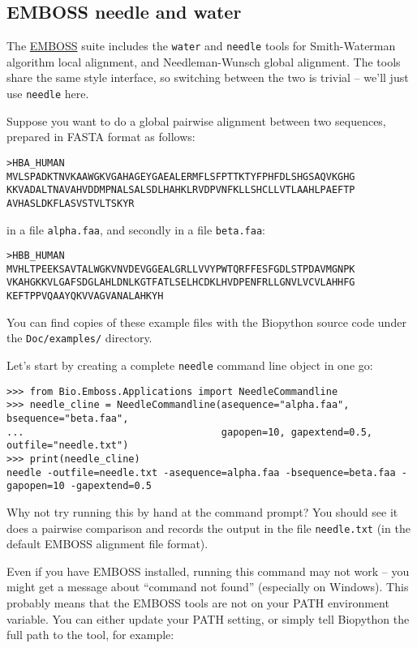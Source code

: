 \subsection{EMBOSS needle and water}
\label{sec:emboss-needle-water}
The \href{http://emboss.sourceforge.net/}{EMBOSS} suite includes the \texttt{water} and
\texttt{needle} tools for Smith-Waterman algorithm local alignment, and Needleman-Wunsch
global alignment. The tools share the same style interface, so switching between the two
is trivial -- we'll just use \texttt{needle} here.

Suppose you want to do a global pairwise alignment between two sequences, prepared in
FASTA format as follows:

\begin{verbatim}
>HBA_HUMAN
MVLSPADKTNVKAAWGKVGAHAGEYGAEALERMFLSFPTTKTYFPHFDLSHGSAQVKGHG
KKVADALTNAVAHVDDMPNALSALSDLHAHKLRVDPVNFKLLSHCLLVTLAAHLPAEFTP
AVHASLDKFLASVSTVLTSKYR
\end{verbatim}

\noindent in a file \texttt{alpha.faa}, and secondly in a file \texttt{beta.faa}:

\begin{verbatim}
>HBB_HUMAN
MVHLTPEEKSAVTALWGKVNVDEVGGEALGRLLVVYPWTQRFFESFGDLSTPDAVMGNPK
VKAHGKKVLGAFSDGLAHLDNLKGTFATLSELHCDKLHVDPENFRLLGNVLVCVLAHHFG
KEFTPPVQAAYQKVVAGVANALAHKYH
\end{verbatim}

You can find copies of these example files with the Biopython source code
under the \verb|Doc/examples/| directory.

Let's start by creating a complete \texttt{needle} command line object in one go:

\begin{verbatim}
>>> from Bio.Emboss.Applications import NeedleCommandline
>>> needle_cline = NeedleCommandline(asequence="alpha.faa", bsequence="beta.faa",
...                                  gapopen=10, gapextend=0.5, outfile="needle.txt")
>>> print(needle_cline)
needle -outfile=needle.txt -asequence=alpha.faa -bsequence=beta.faa -gapopen=10 -gapextend=0.5
\end{verbatim}

Why not try running this by hand at the command prompt? You should see it does a
pairwise comparison and records the output in the file \texttt{needle.txt} (in the
default EMBOSS alignment file format).

Even if you have EMBOSS installed, running this command may not work -- you
might get a message about ``command not found'' (especially on Windows). This
probably means that the EMBOSS tools are not on your PATH environment
variable. You can either update your PATH setting, or simply tell Biopython
the full path to the tool, for example:

